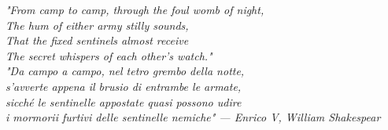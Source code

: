 \documentclass[openright,titlepage,oneside,fleqn,
	headinclude,12pt,a4paper,footinclude,makeidx]{scrbook}%
\begin{document}
\frenchspacing
\raggedbottom
{}
\pagestyle{plain}

\pagestyle{scrheadings}
\tableofcontents
\listoffigures
\lstlistoflistings

\begingroup
\let\clearpage\relax
\let\cleardoublepage\relax
\let\cleardoublepage\relax

\vspace*{8ex}

\listoftables
\endgroup 

\cleardoublepage
\thispagestyle{empty}

\begin{flushright}
\null{}
\emph{"From camp to camp, through the foul womb of night,\\The hum of either army stilly sounds,\\That the fixed sentinels almost receive\\The secret whispers of each other’s watch."\\} 
\null\vspace{5mm}
\emph{"Da campo a campo, nel tetro grembo della notte,\\s’avverte appena il brusio di entrambe le armate,\\sicché le sentinelle appostate quasi possono udire\\i mormorii furtivi delle sentinelle nemiche" \break --- Enrico V, William Shakespear} \null
\end{flushright}
\cleardoublepage







	
	

\printindex
\end{document}
